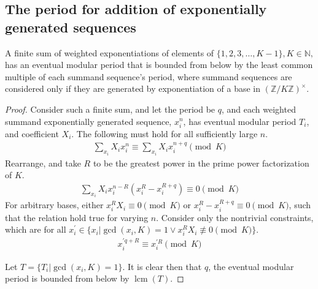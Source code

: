 \documentclass[12pt,reqno]{article}
\DeclareMathOperator{\lcm}{lcm}
\begin{document}
\begin{appendix}
	\section{The period for addition of exponentially generated sequences}\label{app:expsum}
	\begin{proposition}
		A finite sum of weighted exponentiations of elements of $\{1, 2, 3, \ldots, K - 1\}, K\in \mathbb{N},$ has an eventual modular period that is bounded from below by the least common multiple of each summand sequence's period, where summand sequences are considered only if they are generated by exponentiation of a base in $(\mathbb{Z}/K\mathbb{Z})^{\times}$.
		\begin{proof}
				Consider such a finite sum, and let the period be $q$, and each weighted summand exponentially generated sequence, $x_{i}^{n}$,  has eventual modular period $T_{i}$, and coefficient $X_{i}$. The following must hold for all sufficiently large $n$. 
			\begin{align}
				\sum_{x_{i}} X_{i}x_{i}^{n}  \equiv \sum_{x_{i}} X_{i}x_{i}^{n + q} \pmod{K}
			\end{align}
		Rearrange, and take $R$ to be the greatest power in the prime power factorization of $K$.
		\begin{align}
					\sum_{x_{i}} X_{i}x_{i}^{n - R}(x_{i}^{R} - x_{i}^{R + q})  \equiv 0 \pmod{K}
			\end{align}
			For arbitrary bases, either $x_{i}^{R}X_{i} \equiv 0 \pmod{K}$ or ${x_{i}^{R} - x_{i}^{R + q}} \equiv 0 \pmod{K}$, such that the relation hold true for varying $n$. Consider only the nontrivial constraints, which are for all $x^{\prime}_{i} \in \{x_{i}|\gcd(x_{i}, K) = 1 \lor x_{i}^{R}X_{i} \not\equiv 0 \pmod{K} \}$.
			\begin{align}
				{x}_{i}^{\prime q + R} \equiv {x}_{i}^{\prime  R} \pmod{K}
			\end{align}

			Let $T = \{T_{i}|\gcd(x_{i},K) = 1\}$. It is clear then that $q$, the eventual modular period is bounded from below by $\lcm(T)$.
		\end{proof}
	\end{proposition}
	
	

	
	

\end{appendix}
\end{document}
